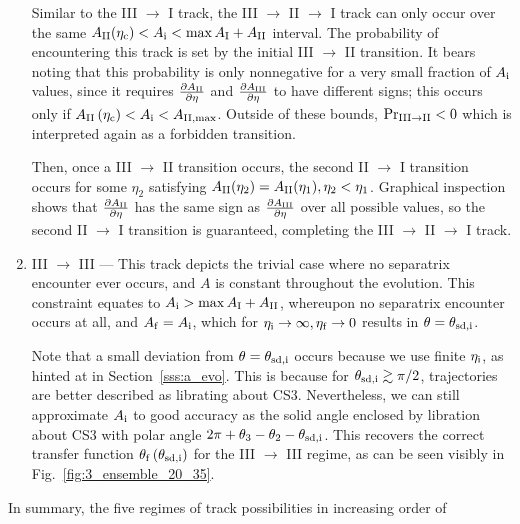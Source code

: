 \documentclass[
        fleqn,
        usenatbib,
        referee,
    ]{mnras}
\newcommand*{\pd}[2]{\frac{\partial#1}{\partial#2}}
\newcommand*{\p}[1]{\left(#1\right)}
\begin{document}
\begin{enumerate}
        Similar to the III $\to$ I track, the III $\to$ II $\to$ I track can
        only occur over the same $A_{\rm II}(\eta_{\rm c}) < A_{\rm i} < \max
        A_{\rm I} + A_{\rm II}$ interval. The probability of encountering this
        track is set by the initial III $\to$ II transition. It bears noting
        that this probability is only nonnegative for a very small fraction of
        $A_{\rm i}$ values, since it requires $\pd{A_{\rm II}}{\eta}$ and
        $\pd{A_{\rm III}}{\eta}$ to have different signs; this occurs only if
        $A_{\rm II}\p{\eta_{\rm c}} < A_{\rm i} < A_{\rm II, \max}$. Outside of
        these bounds, $\Pr_{\rm III \to II} < 0$ which is interpreted again as a
        forbidden transition.

        Then, once a III $\to$ II transition occurs, the second II $\to$ I
        transition occurs for some $\eta_2$ satisfying $A_{\rm II}(\eta_2) =
        A_{\rm II}(\eta_1), \eta_2 < \eta_1$. Graphical inspection shows that
        $\pd{A_{\rm II}}{\eta}$ has the same sign as $\pd{A_{\rm III}}{\eta}$
        over all possible values, so the second II $\to$ I transition is
        guaranteed, completing the III $\to$ II $\to$ I track.

    \item III $\to$ III --- This track depicts the trivial case where no
        separatrix encounter ever occurs, and $A$ is constant throughout the
        evolution. This constraint equates to $A_{\rm i} > \max A_{\rm I} + A_{\rm
        II}$, whereupon no separatrix encounter occurs at all, and $A_{\rm f} =
        A_{\rm i}$,
        which for $\eta_{\rm i} \to \infty, \eta_{\rm f} \to 0$ results in $\theta =
        \theta_{\rm sd, i}$.

        Note that a small deviation from $\theta = \theta_{\rm sd, i}$ occurs
        because we use finite $\eta_{\rm i}$, as hinted at in Section~\ref{sss:a_evo}.
        This is because for $\theta_{\rm sd, i} \gtrsim \pi/2$, trajectories are
        better described as librating about CS3. Nevertheless, we can still
        approximate $A_{\rm i}$ to good accuracy as the solid angle enclosed by
        libration about CS3 with polar angle $2\pi + \theta_3 - \theta_2 -
        \theta_{\rm sd, i}$. This recovers the correct transfer function
        $\theta_{\rm f}\p{\theta_{\rm sd, i}}$ for the III $\to$ III regime, as
        can be seen visibly in Fig.~\ref{fig:3_ensemble_20_35}.
\end{enumerate}
In summary, the five regimes of track possibilities in increasing order of
\end{document}
